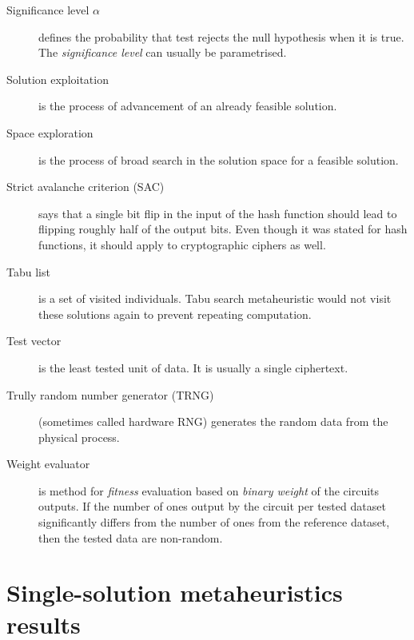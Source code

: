 \documentclass[
    digital,    %
    oneside,    %
    color,
    11pt,
    nocover,
    notable,
    nolof,
    nolot,
]{fithesis3}
\begin{document}
\begin{description}
\item[Significance level $\alpha$] defines the probability that test rejects the null hypothesis when it is true. The \textit{significance level} can usually be parametrised.
\item[Solution exploitation] is the process of advancement of an already feasible solution.
\item[Space exploration] is the process of broad search in the solution space for a feasible solution.
\item[Strict avalanche criterion (SAC)] says that a single bit flip in the input of the hash function should lead to flipping roughly half of the output bits. Even though it was stated for hash functions, it should apply to cryptographic ciphers as well.
\item[Tabu list] is a set of visited individuals. Tabu search metaheuristic would not visit these solutions again to prevent repeating computation.
\item[Test vector] is the least tested unit of data. It is usually a single ciphertext.
\item[Trully random number generator (TRNG)] (sometimes called hardware RNG) generates the random data from the physical process.
\item[Weight evaluator] is method for \textit{fitness} evaluation based on \textit{binary weight} of the circuits outputs. If the number of ones output by the circuit per tested dataset significantly differs from the number of ones from the reference dataset, then the tested data are non-random.
\end{description}

\chapter{Single-solution metaheuristics results}
\label{chap:app-ss-res}
\end{document}
